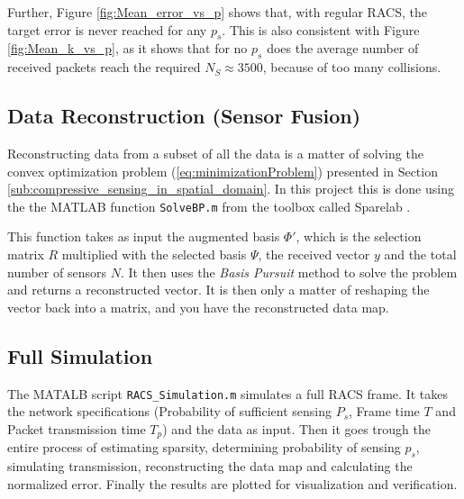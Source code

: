\documentclass[Main]{subfiles}
\begin{document}
		Further, Figure \ref{fig:Mean_error_vs_p} shows that, with regular RACS, the target error is never reached for any $p_s$.
		This is also consistent with Figure \ref{fig:Mean_k_vs_p}, as it shows that for no $p_s$ does the average number of received packets reach the required $N_S \approx 3500$, because of too many collisions.


	\subsection{Data Reconstruction (Sensor Fusion)} %
	\label{sub:data_reconstruction}
		\vspace{-3mm} 
		Reconstructing data from a subset of all the data is a matter of solving the convex optimization problem (\ref{eq:minimizationProblem}) presented in Section \ref{sub:compressive_sensing_in_spatial_domain}.
		In this project this is done using the the MATLAB function \texttt{SolveBP.m} from the toolbox called Sparelab \cite{SparseLab:Online}.
		
		This function takes as input the augmented basis $\Phi'$, which is the selection matrix $R$ multiplied with the selected basis $\Psi$, the received vector $y$ and the total number of sensors $N$.
		It then uses the \emph{Basis Pursuit} method to solve the problem and returns a reconstructed vector.
		It is then only a matter of reshaping the vector back into a matrix, and you have the reconstructed data map.

	

	\subsection{Full Simulation} %
		\label{sub:full_simulation}
		\vspace{-3mm} 
		The MATALB script \texttt{RACS\_Simulation.m} simulates a full RACS frame.
		It takes the network specifications (Probability of sufficient sensing $P_s$, Frame time $T$ and Packet transmission time $T_p$) and the data as input.
		Then it goes trough the entire process of estimating sparsity, determining probability of sensing $p_s$, simulating transmission, reconstructing the data map and calculating the normalized error.
		Finally the results are plotted for visualization and verification.
		

\end{document}
